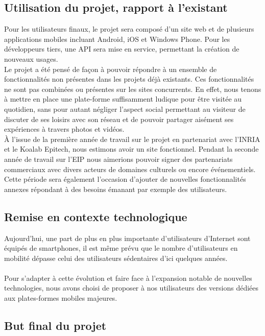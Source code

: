 \documentclass{life-fr}
\begin{document}
\subsection{Utilisation du projet, rapport à l'existant}

Pour les utilisateurs finaux, le projet sera composé d'un site web et de plusieurs applications mobiles incluant Android, iOS et Windows Phone. Pour les développeurs tiers, une API sera mise en service, permettant la création de nouveaux usages.\\

Le projet a été pensé de façon à pouvoir répondre à un ensemble de fonctionnalités non présentes dans les projets déjà existants. Ces fonctionnalités ne sont pas combinées ou présentes sur les sites concurrents. En effet, nous tenons à mettre en place une plate-forme suffisamment ludique pour être visitée au quotidien, sans pour autant négliger l’aspect social permettant au visiteur de discuter de ses loisirs avec son réseau et de pouvoir partager aisément ses expériences à travers photos et vidéos.\\

À l'issue de la première année de travail sur le projet en partenariat avec l'INRIA et le Koalab Epitech, nous estimons avoir un site fonctionnel. Pendant la seconde année de travail sur l'EIP nous aimerions pouvoir signer des partenariats commerciaux avec divers acteurs de domaines culturels ou encore événementiels. Cette période sera également l'occasion d'ajouter de nouvelles fonctionnalités annexes répondant à des besoins émanant par exemple des utilisateurs.

\newpage

\subsection{Remise en contexte technologique}

Aujourd'hui, une part de plus en plus importante d'utilisateurs d'Internet sont équipés de smartphones, il est même prévu que le nombre d'utilisateurs en mobilité dépasse celui des utilisateurs sédentaires d'ici quelques années.\\
\\
Pour s’adapter à cette évolution et faire face à l’expansion notable de nouvelles technologies, nous avons choisi de proposer à nos utilisateurs des versions dédiées aux plates-formes mobiles majeures.

\subsection{But final du projet}
\end{document}

